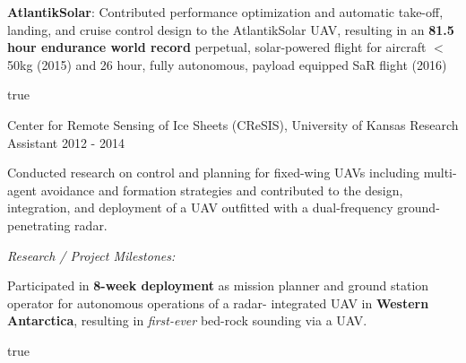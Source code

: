 \begin{cventries}
{\begin{cvitems}
		\item \textbf{AtlantikSolar}: Contributed performance optimization and automatic take-off, landing, and cruise control design to the AtlantikSolar UAV, resulting in an \textbf{81.5 hour endurance world record} perpetual, solar-powered flight for aircraft $<$50kg (2015)  and 26 hour, fully autonomous, payload equipped SaR flight (2016) 
      \end{cvitems}
    } %
    {} %
    {true}
    {}
    
\cvexpentry
  	{Center for Remote Sensing of Ice Sheets (CReSIS), University of Kansas} %
  	{Research Assistant} %
    {} %
    {2012 - 2014} %
    {
      \begin{cvitems} %
      	\item Conducted research on control and planning for fixed-wing UAVs including multi-agent avoidance and formation strategies and contributed to the design, integration, and deployment of a UAV outfitted with a dual-frequency ground-penetrating radar.
        \item[] \hspace{-1.2em} \emph{Research / Project Milestones:}
        \item Participated in \textbf{8-week deployment} as mission planner and ground station operator for autonomous operations of a radar-
integrated UAV in \textbf{Western Antarctica}, resulting in \emph{first-ever} bed-rock sounding via a UAV. 
      \end{cvitems}
    } %
    {} %
    {true}
    {}
    
\end{cventries}
